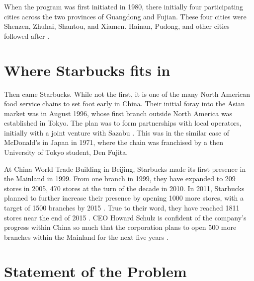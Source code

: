 When the program was first initiated in 1980, there initially four participating
cities across the two provinces of Guangdong and Fujian. These four cities were
Shenzen, Zhuhai, Shantou, and Xiamen. Hainan, Pudong, and other cities followed
after \autocite{jaggi_chinas_1996}.


\section{Where Starbucks fits in}

Then came Starbucks. While not the first, it is one of the many North American
food service chains to set foot early in China. Their initial foray into the Asian
market was in August 1996, whose first branch outside North America was
established in Tokyo. The plan was to form partnerships with local operators,
initially with a joint venture with Sazabu \autocite{harrison_exporting_2005}.
This was in the similar case of McDonald's in Japan in 1971, where the chain was
franchised by a then University of Tokyo student, Den Fujita.
\autocite[21, 113]{watson_golden_2006}

At China World Trade Building in Beijing, Starbucks made its first presence in
the Mainland in 1999. From one branch in 1999, they have expanded to 209 stores
in 2005, 470 stores at the turn of the decade in 2010. In 2011, Starbucks
planned to further increase their presence by opening 1000 more stores, with a
target of 1500 branches by 2015 \autocite{_starbucks_2011}. True to their word,
they have reached 1811 stores near the end of 2015
\autocite{statista_starbucks_2015}. CEO Howard Schulz is confident of the
company's progress within China so much that the corporation plans to open 500
more branches within the Mainland for the next five years
\autocite{burkitt_starbucks_2016}.





\section{Statement of the Problem}


